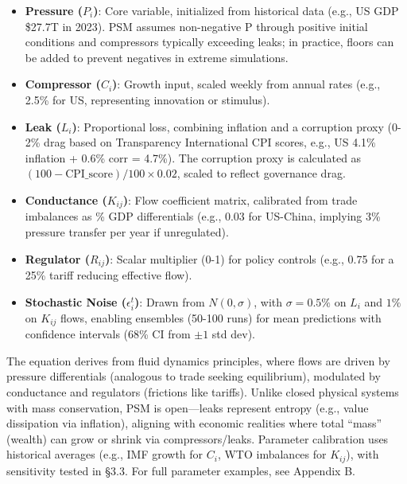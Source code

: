 \documentclass[11pt]{article}
\begin{document}
\begin{itemize}
\item \textbf{Pressure ($P_i$)}: Core variable, initialized from historical data (e.g., US GDP \$27.7T in 2023). PSM assumes non-negative P through positive initial conditions and compressors typically exceeding leaks; in practice, floors can be added to prevent negatives in extreme simulations.
\item \textbf{Compressor ($C_i$)}: Growth input, scaled weekly from annual rates (e.g., 2.5\% for US, representing innovation or stimulus).
\item \textbf{Leak ($L_i$)}: Proportional loss, combining inflation and a corruption proxy (0-2\% drag based on Transparency International CPI scores, e.g., US 4.1\% inflation + 0.6\% corr = 4.7\%). The corruption proxy is calculated as $(100 - \text{CPI\_score}) / 100 \times 0.02$, scaled to reflect governance drag.
\item \textbf{Conductance ($K_{ij}$)}: Flow coefficient matrix, calibrated from trade imbalances as \% GDP differentials (e.g., 0.03 for US-China, implying 3\% pressure transfer per year if unregulated).
\item \textbf{Regulator ($R_{ij}$)}: Scalar multiplier (0-1) for policy controls (e.g., 0.75 for a 25\% tariff reducing effective flow).
\item \textbf{Stochastic Noise ($\epsilon_i^t$)}: Drawn from $N(0, \sigma)$, with $\sigma = 0.5\%$ on $L_i$ and $1\%$ on $K_{ij}$ flows, enabling ensembles (50-100 runs) for mean predictions with confidence intervals (68\% CI from $\pm 1$ std dev).
\end{itemize}

The equation derives from fluid dynamics principles, where flows are driven by pressure differentials (analogous to trade seeking equilibrium), modulated by conductance and regulators (frictions like tariffs). Unlike closed physical systems with mass conservation, PSM is open---leaks represent entropy (e.g., value dissipation via inflation), aligning with economic realities where total ``mass'' (wealth) can grow or shrink via compressors/leaks. Parameter calibration uses historical averages (e.g., IMF growth for $C_i$, WTO imbalances for $K_{ij}$), with sensitivity tested in \S3.3. For full parameter examples, see Appendix B.
\end{document}
